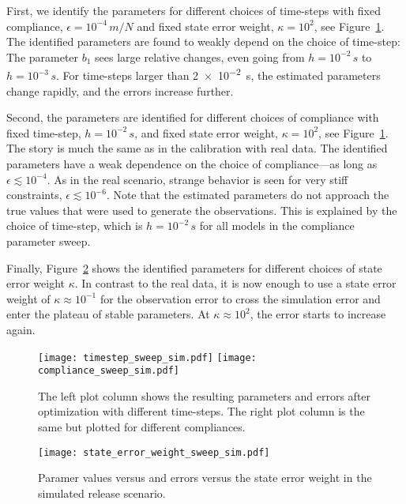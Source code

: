 \documentclass[preprint,12pt]{elsarticle}
\newcommand\figref{Figure~\ref}
\numberwithin{equation}{section}
\def\stateweight{\kappa}
\begin{document}
First, we identify the parameters for different choices of time-steps with fixed compliance, $\epsilon = 10^{-4}\,\si{m/N}$ and fixed state error weight, $\stateweight = 10^2$, see \figref{fig:compliance_timestep_sweeps}.
The identified parameters are found to weakly depend on the choice of time-step:
The parameter $b_1$ sees large relative changes, even going from $h = 10^{-2}\,\si{s}$ to $h = 10^{-3}\,\si{s}$.
For time-steps larger than \SI{2e-2}{s}, the estimated parameters change rapidly, and the errors increase further.

Second, the parameters are identified for different choices of compliance with fixed time-step, $h = 10^{-2}\,\si{s}$, and fixed state error weight, $\stateweight = 10^2$, see \figref{fig:compliance_timestep_sweeps}.
The story is much the same as in the calibration with real data.
The identified parameters have a weak dependence on the choice of compliance---as long as $\epsilon \lesssim 10^{-4}$.
As in the real scenario, strange behavior is seen for very stiff constraints, $\epsilon \lesssim 10^{-6}$.
Note that the estimated parameters do not approach the true values that were used to generate the observations.
This is explained by the choice of time-step, which is $h = 10^{-2}\,\si{s}$ for all models in the compliance parameter sweep.

Finally, \figref{fig:state_error_weight_sweep_sim} shows the identified parameters for different choices of state error weight $\stateweight$.
In contrast to the real data, it is now enough to use a state error weight of $\kappa \approx 10^{-1}$ for the observation error to cross the simulation error and enter the plateau of stable parameters.
At $\kappa \approx 10^2$, the error starts to increase again.
\begin{figure}
    \centering
    \texttt{[image: timestep\_sweep\_sim.pdf]}
    \texttt{[image: compliance\_sweep\_sim.pdf]}
    \caption{
        The left plot column shows the resulting parameters and errors after optimization with different time-steps.
        The right plot column is the same but plotted for different compliances.
    }
    \label{fig:compliance_timestep_sweeps}
\end{figure}
\begin{figure}
    \centering
    \texttt{[image: state\_error\_weight\_sweep\_sim.pdf]}
    \caption{Paramer values versus and errors versus the state error weight in the simulated release scenario.}
    \label{fig:state_error_weight_sweep_sim}
\end{figure}
\end{document}
